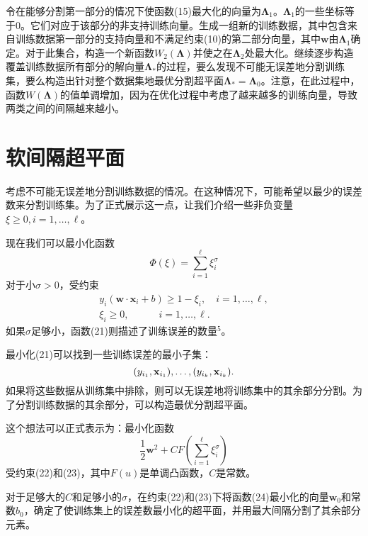 \documentclass[lang=cn,11pt,a4paper]{elegantpaper}
\begin{document}
	令在能够分割第一部分的情况下使函数(15)最大化的向量为$\mathbf{\Lambda}_1$。$\mathbf{\Lambda}_1$的一些坐标等于$0$。它们对应于该部分的非支持训练向量。生成一组新的训练数据，其中包含来自训练数据第一部分的支持向量和不满足约束(10)的第二部分向量，其中$\mathbf{w}$由$\mathbf{\Lambda}_1$确定。对于此集合，构造一个新函数$W_2(\mathbf{\Lambda})$并使之在$\mathbf{\Lambda}_2$处最大化。继续逐步构造覆盖训练数据所有部分的解向量$\mathbf{\Lambda}_*$的过程，要么发现不可能无误差地分割训练集，要么构造出针对整个数据集地最优分割超平面$\mathbf{\Lambda}_*=\mathbf{\Lambda}_0$。注意，在此过程中，函数$W(\mathbf{\Lambda})$的值单调增加，因为在优化过程中考虑了越来越多的训练向量，导致两类之间的间隔越来越小。

	\section{软间隔超平面}
	考虑不可能无误差地分割训练数据的情况。在这种情况下，可能希望以最少的误差数来分割训练集。为了正式展示这一点，让我们介绍一些非负变量$\xi\geq0,i=1,\dots,\ell$。

	现在我们可以最小化函数
	\begin{equation}
		\Phi(\xi)=\sum_{i=1}^\ell\xi_i^\sigma\tag{21}
	\end{equation}
	对于小$\sigma>0$，受约束
	\begin{align}
		y_i(\mathbf{w}·\mathbf{x}_i+b) \geq 1-\xi_i,\quad i=1,\dots,\ell, \tag{22} \\
		\xi_i \geq 0,\quad \qquad i=1,\dots,\ell.\tag{23}
	\end{align}
	如果$\sigma$足够小，函数(21)则描述了训练误差的数量$^5$。

	最小化(21)可以找到一些训练误差的最小子集：
	\begin{equation}
		(y_{i_1},\mathbf{x}_{i_1}),\dots,(y_{i_k},\mathbf{x}_{i_k}).\notag
	\end{equation}
	如果将这些数据从训练集中排除，则可以无误差地将训练集中的其余部分分割。为了分割训练数据的其余部分，可以构造最优分割超平面。

	这个想法可以正式表示为：最小化函数
	\begin{equation}
		\frac{1}{2}\mathbf{w}^2+CF\left(\sum_{i=1}^{\ell}\xi_i^\sigma\right)\tag{24}
	\end{equation}
	受约束(22)和(23)，其中$F(u)$是单调凸函数，$C$是常数。

	对于足够大的$C$和足够小的$\sigma$，在约束(22)和(23)下将函数(24)最小化的向量$\mathbf{w}_0$和常数$b_0$，确定了使训练集上的误差数最小化的超平面，并用最大间隔分割了其余部分元素。
\end{document}
